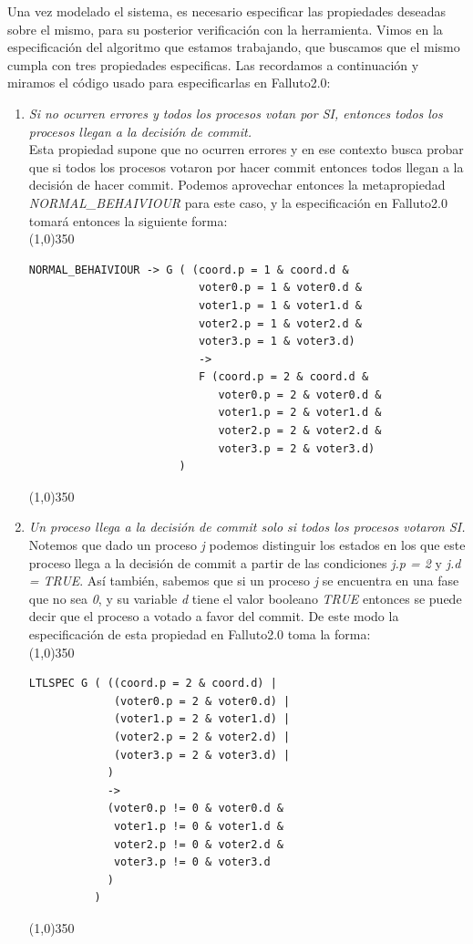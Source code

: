 \documentclass[titlepage, 12pt]{book}
\begin{document}
Una vez modelado el sistema, es necesario especificar las propiedades deseadas sobre el mismo, para su posterior verificaci\'on con la herramienta. Vimos en la especificaci\'on del algoritmo que estamos trabajando, que buscamos que el mismo cumpla con tres propiedades especificas. Las recordamos a continuaci\'on y miramos el c\'odigo usado para especificarlas en Falluto2.0:
\begin{enumerate}
\item \textit{Si no ocurren errores y todos los procesos votan por SI, entonces todos los procesos llegan a la decisi\'on de commit.}\\ Esta propiedad supone que no ocurren errores y en ese contexto busca probar que si todos los procesos votaron por hacer commit entonces todos llegan a la decisi\'on de hacer commit. Podemos aprovechar entonces la metapropiedad \textit{NORMAL\_BEHAIVIOUR} para este caso, y la especificaci\'on en Falluto2.0 tomar\'a entonces la siguiente forma:\\
\noindent \line(1,0){350}
\begin{verbatim}
NORMAL_BEHAIVIOUR -> G ( (coord.p = 1 & coord.d & 
                          voter0.p = 1 & voter0.d & 
                          voter1.p = 1 & voter1.d & 
                          voter2.p = 1 & voter2.d & 
                          voter3.p = 1 & voter3.d) 
                          -> 
                          F (coord.p = 2 & coord.d & 
                             voter0.p = 2 & voter0.d & 
                             voter1.p = 2 & voter1.d & 
                             voter2.p = 2 & voter2.d & 
                             voter3.p = 2 & voter3.d)
                       )
\end{verbatim}
\noindent \line(1,0){350}
~\\

\item \textit{Un proceso llega a la decisi\'on de commit solo si todos los procesos votaron SI.}\\ Notemos que dado un proceso \textit{j} podemos distinguir los estados en los que este proceso llega a la decisi\'on de commit a partir de las condiciones \textit{j.p = 2} y \textit{j.d = TRUE}. As\'i tambi\'en, sabemos que si un proceso \textit{j} se encuentra en una fase que no sea \textit{0}, y su variable \textit{d} tiene el valor booleano \textit{TRUE} entonces se puede decir que el proceso a votado a favor del commit. De este modo la especificaci\'on de esta propiedad en Falluto2.0 toma la forma:\\
\noindent \line(1,0){350}
\begin{verbatim}
LTLSPEC G ( ((coord.p = 2 & coord.d) |
             (voter0.p = 2 & voter0.d) |            
             (voter1.p = 2 & voter1.d) |
             (voter2.p = 2 & voter2.d) |
             (voter3.p = 2 & voter3.d) |
            )
            -> 
            (voter0.p != 0 & voter0.d & 
             voter1.p != 0 & voter1.d & 
             voter2.p != 0 & voter2.d & 
             voter3.p != 0 & voter3.d
            )
          ) 
\end{verbatim}
\noindent \line(1,0){350}



\end{enumerate}
\end{document}
